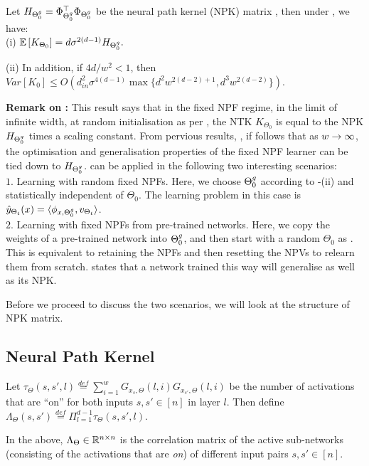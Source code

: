 \begin{theorem}\label{th:main} Let $H_{{\Theta}^g_0}=\Phi^\top_{{\Theta}^g_0}\Phi_{{\Theta}^g_0}$ be the neural path kernel (NPK) matrix , then under , we have:\\
(i) $\mathbb{E}\left[K_{\Theta_0}\right]=d\sigma^{2(d-1)} H_{{\Theta}^g_0}.$

(ii) In addition, if ${4d}/{w^2}<1$, then $Var\left[K_0\right]\leq O\left(d^2_{in}\sigma^{4(d-1)}\max\{d^2w^{2(d-2)+1}, d^3w^{2(d-2)}\}\right)$.
\end{theorem}
\textbf{Remark on :} This result says that in the fixed NPF regime, in the limit of infinite width, at random initialisation as per , the NTK $K_{\Theta_0}$ is equal to the NPK $H_{{\Theta}^g_0}$ times a scaling constant. From pervious results, \cite{arora2019exact,cao2019generalization}, if follows that as $w\rightarrow\infty$, the optimisation and generalisation properties of the fixed NPF learner can be tied down to $H_{{\Theta}^g_0}$.  can be applied in the following two interesting scenarios:\\
$1.$ Learning with random fixed NPFs. Here, we choose ${\Theta}^g_0$ according to -(ii) and statistically independent of $\Theta_0$. The learning problem in this case is $\hat{y}_{\Theta_t}(x)=\langle \phi_{x,{\Theta}^g_0},v_{\Theta_t}\rangle$.\\
$2.$ Learning with fixed NPFs from pre-trained networks. Here, we copy the weights of a pre-trained network into ${\Theta}^g_0$, and then start with a random $\Theta_0$ as . This is equivalent to retaining the NPFs and then resetting the NPVs to relearn them from scratch.  states that a network trained this way will generalise as well as its NPK.

Before we proceed to discuss the two scenarios, we will look at the structure of NPK matrix.
\subsection{Neural Path Kernel}
\begin{definition}\label{def:lambda}
Let $\tau_{\Theta}(s,s',l)\stackrel{def}=\sum_{i=1}^w G_{x_s,\Theta}(l,i)G_{x_{s'},\Theta}(l,i)$ be the number of activations that are ``on'' for both inputs $s,s'\in[n]$ in layer $l$. Then define $\Lambda_{\Theta}(s,s')\stackrel{def}=\Pi_{l=1}^{d-1}\tau_{\Theta}(s,s',l)$.
\end{definition}
In the  above, $\Lambda_{\Theta}\in\mathbb{R}^{n\times n}$ is the correlation matrix of the active sub-networks (consisting of the activations that are \emph{on}) of different input pairs $s,s'\in[n]$. %

